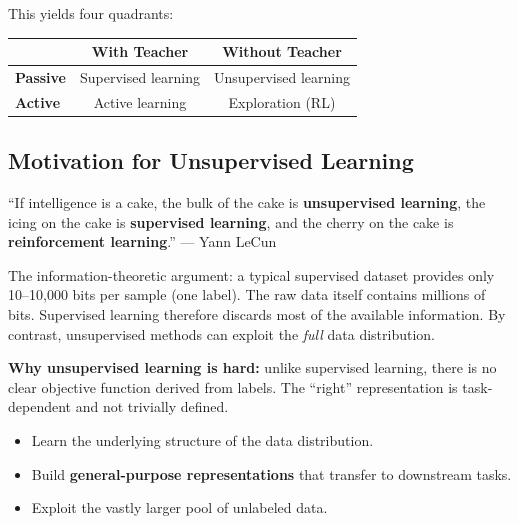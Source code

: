 \documentclass[11pt,a4paper]{article}
\theoremstyle{definition}
\theoremstyle{plain}
\theoremstyle{remark}
\begin{document}
This yields four quadrants:

\begin{center}
\begin{tabular}{|l|c|c|}
\hline
 & \textbf{With Teacher} & \textbf{Without Teacher} \\
\hline
\textbf{Passive} & Supervised learning & Unsupervised learning \\
\hline
\textbf{Active} & Active learning & Exploration (RL) \\
\hline
\end{tabular}
\end{center}

\subsection{Motivation for Unsupervised Learning}

\begin{tcolorbox}[colback=green!5!white,colframe=green!60!black,title=\textbf{LeCun's Cake Analogy}]
``If intelligence is a cake, the bulk of the cake is \textbf{unsupervised learning}, the icing on the cake is \textbf{supervised learning}, and the cherry on the cake is \textbf{reinforcement learning}.'' --- Yann LeCun
\end{tcolorbox}

The information-theoretic argument: a typical supervised dataset provides only 10--10{,}000 bits per sample (one label). The raw data itself contains millions of bits. Supervised learning therefore discards most of the available information. By contrast, unsupervised methods can exploit the \emph{full} data distribution.

\textbf{Why unsupervised learning is hard:} unlike supervised learning, there is no clear objective function derived from labels. The ``right'' representation is task-dependent and not trivially defined.

\begin{tcolorbox}[colback=yellow!5!white,colframe=orange!80!black,title=\textbf{Key Goals of Unsupervised Learning}]
\begin{itemize}[leftmargin=*]
    \item Learn the underlying structure of the data distribution.
    \item Build \textbf{general-purpose representations} that transfer to downstream tasks.
    \item Exploit the vastly larger pool of unlabeled data.
\end{itemize}
\end{tcolorbox}
\end{document}
